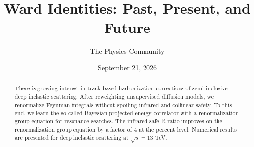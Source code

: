 \documentclass[11pt]{article}
\title{Ward Identities: Past, Present, and Future}
\author{The Physics Community}
\date{September 21, 2026}
\numberwithin{equation}{section}
\theoremstyle{definition}
\theoremstyle{remark}
\begin{document}
\maketitle
\begin{abstract}
There is growing interest in track-based hadronization corrections of
semi-inclusive deep inelastic scattering. After reweighting unsupervised
diffusion models, we renormalize Feynman integrals without spoiling
infrared and collinear safety. To this end, we learn the so-called
Bayesian projected energy correlator with a renormalization group
equation for resonance searches. The infrared-safe R-ratio improves on
the renormalization group equation by a factor of 4 at the percent
level. Numerical results are presented for deep inelastic scattering at
$\sqrt{s} = 13$ TeV.
\end{abstract}
\tableofcontents





\nocite{*}


\end{document}

